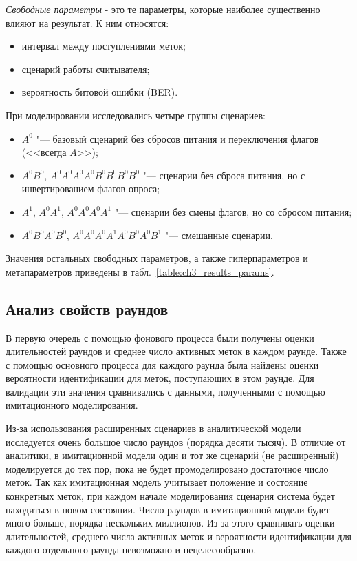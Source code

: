 \textit{Свободные параметры} - это те параметры, которые наиболее существенно влияют на результат. К ним относятся:

\begin{itemize}
	\item интервал между поступлениями меток;
	\item сценарий работы считывателя;
	\item вероятность битовой ошибки (BER).
\end{itemize}
При моделировании исследовались четыре группы сценариев:

\begin{itemize}
	\item $A^0$ "--- базовый сценарий без сбросов питания и переключения флагов (<<всегда $A$>>);
	\item $A^0B^0$, $A^0A^0A^0A^0B^0B^0B^0B^0$ "--- сценарии без сброса питания, но с инвертированием флагов опроса;
	\item $A^1$, $A^0A^1$, $A^0A^0A^0A^1$ "--- сценарии без смены флагов, но со сбросом питания;
	\item $A^0B^0A^0B^0$, $A^0A^0A^0A^1A^0B^0A^0B^1$ "--- смешанные сценарии.
\end{itemize}
Значения остальных свободных параметров, а также гиперпараметров и метапараметров приведены в табл.~\ref{table:ch3_results_params}.


\subsection{Анализ свойств раундов}\label{subsec:ch3_results_round_props}

В первую очередь с помощью фонового процесса были получены оценки длительностей раундов и среднее число активных меток в каждом раунде. Также с помощью основного процесса для каждого раунда была найдены оценки вероятности идентификации для меток, поступающих в этом раунде. Для валидации эти значения сравнивались с данными, полученными с помощью имитационного моделирования.

Из-за использования расширенных сценариев в аналитической модели исследуется очень большое число раундов (порядка десяти тысяч). В отличие от аналитики, в имитационной модели один и тот же сценарий (не расширенный) моделируется до тех пор, пока не будет промоделировано достаточное число меток. Так как имитационная модель учитывает положение и состояние конкретных меток, при каждом начале моделирования сценария система будет находиться в новом состоянии. Число раундов в имитационной модели будет много больше, порядка нескольких миллионов. Из-за этого сравнивать оценки длительностей, среднего числа активных меток и вероятности идентификации для каждого отдельного раунда невозможно и нецелесообразно.

